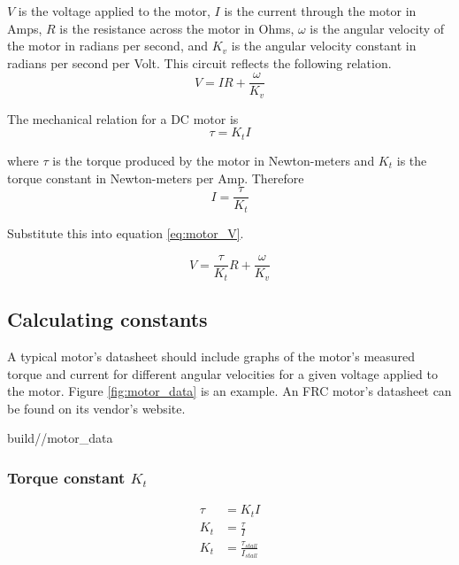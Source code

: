 $V$ is the voltage applied to the motor, $I$ is the current through the motor in
Amps, $R$ is the resistance across the motor in Ohms, $\omega$ is the angular
velocity of the motor in radians per second, and $K_v$ is the angular velocity
constant in radians per second per Volt. This circuit reflects the following
relation.
\begin{equation}
  V = IR + \frac{\omega}{K_v} \label{eq:motor_V}
\end{equation}

The mechanical relation for a DC motor is
\begin{equation}
  \tau = K_t I
\end{equation}

where $\tau$ is the torque produced by the motor in Newton-meters and $K_t$ is
the torque constant in Newton-meters per Amp. Therefore
\begin{equation*}
  I = \frac{\tau}{K_t}
\end{equation*}

Substitute this into equation \eqref{eq:motor_V}.

\begin{equation}
  V = \frac{\tau}{K_t} R + \frac{\omega}{K_v} \label{eq:motor_tau_V}
\end{equation}

\subsection{Calculating constants}

A typical motor's datasheet should include graphs of the motor's measured torque
and current for different angular velocities for a given voltage applied to the
motor. Figure \ref{fig:motor_data} is an example. An FRC motor's datasheet can
be found on its vendor's website.
\begin{svg}{build/\chapterpath/motor_data}
  \caption{Example motor datasheet for 775pro}
  \label{fig:motor_data}
\end{svg}

\subsubsection{Torque constant $K_t$}
\begin{align}
  \tau &= K_t I \nonumber \\
  K_t &= \frac{\tau}{I} \nonumber \\
  K_t &= \frac{\tau_{stall}}{I_{stall}}
\end{align}

